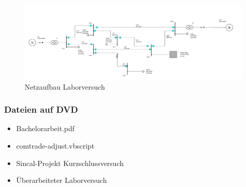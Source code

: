 	\begin{figure}[H]
	\centering
	\includegraphics[scale=0.35, angle=90]{img/praktikum-netz}
	\caption{Netzaufbau Laborversuch}
	\label{praktikum-netz}
	\end{figure}
	
\subsubsection*{Dateien auf DVD}
\begin{itemize}
\item Bachelorarbeit.pdf
\item comtrade-adjust.vbscript
\item Sincal-Projekt Kurzschlussversuch
\item Überarbeiteter Laborversuch
\end{itemize}